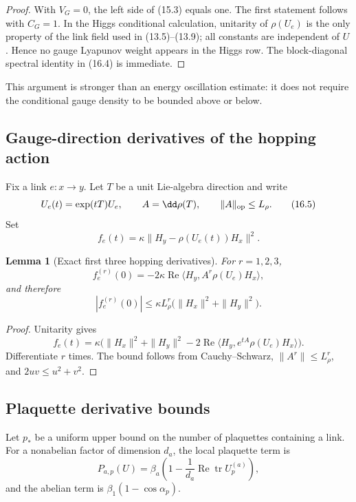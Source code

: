 \documentclass[11pt]{article}
\newtheorem{lemma}[theorem]{Lemma}
\theoremstyle{remark}
\begin{document}
\begin{proof}
With \(V_G=0\), the left side of (15.3) equals one.  The first
statement follows with \(C_G=1\).  In the Higgs conditional
calculation, unitarity of \(\rho(U_e)\) is the only property of the
link field used in (13.5)--(13.9); all constants are independent of
\(U\).  Hence no gauge Lyapunov weight appears in the Higgs row.
The block-diagonal spectral identity in (16.4) is immediate.
\end{proof}

This argument is stronger than an energy oscillation estimate: it
does not require the conditional gauge density to be bounded above
or below.

\subsection{Gauge-direction derivatives of the hopping action}

Fix a link \(e:x\to y\).  Let \(T\) be a unit Lie-algebra direction
and write
\[
 U_e(t)=\exp(tT)U_e,\qquad
 A=\dd\rho(T),\qquad \|A\|_{\rm op}\leq L_\rho.      \tag{16.5}
\]
Set
\[
 f_e(t)=\kappa\|H_y-\rho(U_e(t))H_x\|^2.            \tag{16.6}
\]

\begin{lemma}[Exact first three hopping derivatives]
\label{lem:v17v16-hopping-derivatives}
For \(r=1,2,3\),
\[
 f_e^{(r)}(0)
 =-2\kappa\operatorname{Re}
 \langle H_y,A^r\rho(U_e)H_x\rangle,               \tag{16.7}
\]
and therefore
\[
 |f_e^{(r)}(0)|
 \leq
 \kappa L_\rho^r
 \bigl(\|H_x\|^2+\|H_y\|^2\bigr).                  \tag{16.8}
\]
\end{lemma}

\begin{proof}
Unitarity gives
\[
 f_e(t)=\kappa\bigl(
 \|H_x\|^2+\|H_y\|^2
 -2\operatorname{Re}
 \langle H_y,e^{tA}\rho(U_e)H_x\rangle\bigr).
\]
Differentiate \(r\) times.  The bound follows from
Cauchy--Schwarz, \(\|A^r\|\leq L_\rho^r\), and
\(2uv\leq u^2+v^2\).
\end{proof}

\subsection{Plaquette derivative bounds}

Let \(p_*\) be a uniform upper bound on the number of plaquettes
containing a link.  For a nonabelian factor of dimension \(d_a\),
the local plaquette term is
\[
 P_{a,p}(U)
 =\beta_a\left(
 1-\frac1{d_a}\operatorname{Re}\operatorname{tr}U_p^{(a)}
 \right),                                         \tag{16.9}
\]
and the abelian term is
\(\beta_1(1-\cos\alpha_p)\).
\end{document}
